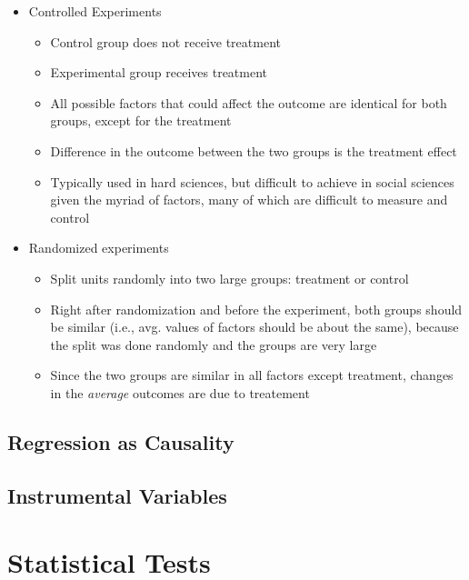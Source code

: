 \documentclass[]{book}
\providecommand{\tightlist}{%
  \setlength{\itemsep}{0pt}\setlength{\parskip}{0pt}}
\begin{document}
\begin{itemize}
\tightlist
\item
  Controlled Experiments

  \begin{itemize}
  \tightlist
  \item
    Control group does not receive treatment
  \item
    Experimental group receives treatment
  \item
    All possible factors that could affect the outcome are identical for both groups, except for the treatment
  \item
    Difference in the outcome between the two groups is the treatment effect
  \item
    Typically used in hard sciences, but difficult to achieve in social sciences given the myriad of factors, many of which are difficult to measure and control
  \end{itemize}
\item
  Randomized experiments

  \begin{itemize}
  \tightlist
  \item
    Split units randomly into two large groups: treatment or control
  \item
    Right after randomization and before the experiment, both groups should be similar (i.e., avg. values of factors should be about the same), because the split was done randomly and the groups are very large
  \item
    Since the two groups are similar in all factors except treatment, changes in the \emph{average} outcomes are due to treatement
  \end{itemize}
\end{itemize}

\hypertarget{regression-as-causality}{%
\subsection{Regression as Causality}\label{regression-as-causality}}

\hypertarget{instrumental-variables}{%
\subsection{Instrumental Variables}\label{instrumental-variables}}

\hypertarget{stat}{%
\section{Statistical Tests}\label{stat}}
\end{document}
